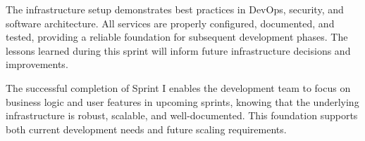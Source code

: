 The infrastructure setup demonstrates best practices in DevOps, security, and software architecture. All services are properly configured, documented, and tested, providing a reliable foundation for subsequent development phases. The lessons learned during this sprint will inform future infrastructure decisions and improvements.

The successful completion of Sprint I enables the development team to focus on business logic and user features in upcoming sprints, knowing that the underlying infrastructure is robust, scalable, and well-documented. This foundation supports both current development needs and future scaling requirements.